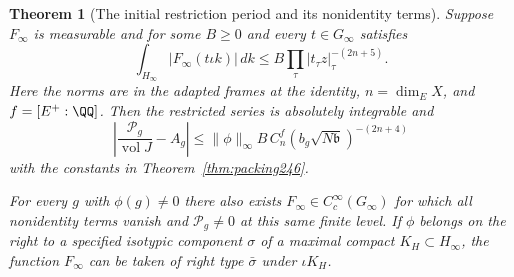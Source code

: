 \documentclass[a4paper,11pt]{article}
\newtheorem{theorem}[proposition]{Theorem}
\theoremstyle{definition}
\theoremstyle{remark}
\numberwithin{equation}{section}
\begin{document}
\begin{theorem}[The initial restriction period and its nonidentity terms]
\label{thm:restriction246}
Suppose \(F_\infty\) is measurable and for some \(B\ge0\) and
every \(t\in G_\infty\) satisfies
\[
 \int_{H_\infty}|F_\infty(t\iota k)|\,dk
              \le B\prod_\tau |t_\tau z|_\tau^{-(2n+5)} .
\]
Here the norms are in the adapted frames at the identity,
\(n=\dim_E X\), and \(f=[E^+:\QQ]\).
Then the restricted series is absolutely integrable and
\[
 \left|\frac{\mathcal P_g}{\operatorname{vol}J}-A_g\right|
    \le \|\phi\|_\infty B\, C_n^f
                  (b_g\sqrt{N\mathfrak b})^{-(2n+4)}
\]
with the constants in Theorem~\ref{thm:packing246}.

For every \(g\) with \(\phi(g)\ne0\) there also exists
\(F_\infty\in C_c^\infty(G_\infty)\) for which all nonidentity
terms vanish and \(\mathcal P_g\ne0\) at this same finite level.
If \(\phi\) belongs on the right to a specified isotypic component
\(\sigma\) of a maximal compact \(K_H\subset H_\infty\), the
function \(F_\infty\) can be taken of right type \(\bar\sigma\)
under \(\iota K_H\).
\end{theorem}
\end{document}
